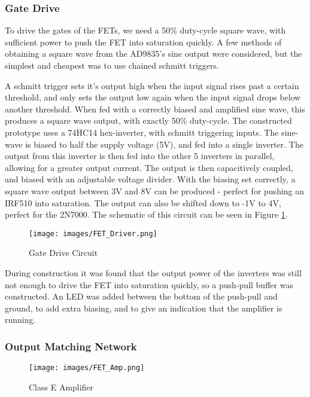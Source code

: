\documentclass[a4paper,12pt]{article}
\begin{document}
\subsubsection{Gate Drive}
To drive the gates of the FETs, we need a 50\% duty-cycle square wave, with sufficient power to push the FET into saturation quickly. A few methods of obtaining a square wave from the AD9835's sine output were considered, but the simplest and cheapest was to use chained schmitt triggers.

A schmitt trigger sets it's output high when the input signal rises past a certain threshold, and only sets the output low again when the input signal drops below another threshold. When fed with a correctly biased and amplified sine wave, this produces a square wave output, with exactly 50\% duty-cycle. The constructed prototype uses a 74HC14 hex-inverter, with schmitt triggering inputs. The sine-wave is biased to half the supply voltage (5V), and fed into a single inverter. The output from this inverter is then fed into the other 5 inverters in parallel, allowing for a greater output current. The output is then capacitively coupled, and biased with an adjustable voltage divider. With the biasing set correctly, a square wave output between 3V and 8V can be produced - perfect for pushing an IRF510 into saturation. The output can also be shifted down to -1V to 4V, perfect for the 2N7000. The schematic of this circuit can be seen in Figure \ref{fig:fet_drive}.

\begin{figure}[h]
  \begin{center}
    \texttt{[image: images/FET\_Driver.png]}
  \end{center}
  \caption{Gate Drive Circuit}
  \label{fig:fet_drive}
\end{figure}

During construction it was found that the output power of the inverters was still not enough to drive the FET into saturation quickly, so a push-pull buffer was constructed. An LED was added between the bottom of the push-pull and ground, to add extra biasing, and to give an indication that the amplifier is running. 

\subsubsection{Output Matching Network}

\begin{figure}[h]
  \begin{center}
    \texttt{[image: images/FET\_Amp.png]}
  \end{center}
  \caption{Class E Amplifier}
  \label{fig:fet_amp}
\end{figure}
\end{document}
